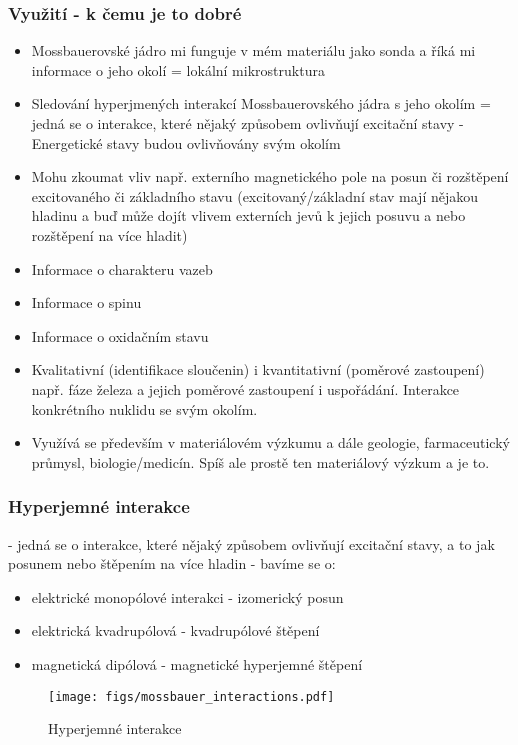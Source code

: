 \subsubsection{Využití - k čemu je to dobré}
\begin{itemize}
    \item Mossbauerovské jádro mi funguje v mém materiálu jako sonda a říká mi informace o jeho okolí = lokální mikrostruktura
    \item Sledování hyperjmených interakcí Mossbauerovského jádra s jeho okolím = jedná se o interakce, které nějaký způsobem ovlivňují excitační stavy - Energetické stavy budou ovlivňovány svým okolím
    \item Mohu zkoumat vliv např. externího magnetického pole na posun či rozštěpení excitovaného či základního stavu (excitovaný/základní stav mají nějakou hladinu a buď může dojít vlivem externích jevů k jejich posuvu a nebo rozštěpení na více hladit)
    \item Informace o charakteru vazeb
    \item Informace o spinu
    \item Informace o oxidačním stavu
    \item Kvalitativní (identifikace sloučenin) i kvantitativní (poměrové zastoupení) např. fáze železa a jejich poměrové zastoupení i uspořádání. Interakce konkrétního nuklidu se svým okolím. 
    \item Využívá se především v materiálovém výzkumu a dále geologie, farmaceutický průmysl, biologie/medicín. Spíš ale prostě ten materiálový výzkum a je to.
\end{itemize}

\subsubsection{Hyperjemné interakce}

- jedná se o interakce, které nějaký způsobem ovlivňují excitační stavy, a to jak posunem nebo štěpením na více hladin
- bavíme se o:
\begin{itemize}
   \item elektrické monopólové interakci - izomerický posun
   \item elektrická kvadrupólová - kvadrupólové štěpení
   \item magnetická dipólová - magnetické hyperjemné štěpení
\end{itemize}

\begin{figure}[ht!]
   \centering
   \texttt{[image: figs/mossbauer\_interactions.pdf]}
   \caption{Hyperjemné interakce}
   \label{fig:6_2_mossbauer_hyperjemne_interakce}
\end{figure}


